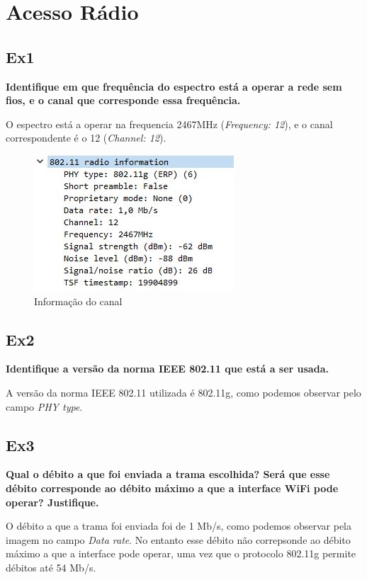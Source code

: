 \documentclass{article}
\begin{document}
\section{Acesso Rádio}
\subsection{Ex1}
\textbf{Identifique em que frequência do espectro está a operar a rede sem fios, e o canal que corresponde essa frequência.}\\\par
O espectro está a operar na frequencia 2467MHz (\textit{Frequency: 12}), e o canal correspondente é o 12 (\textit{Channel: 12}). 
\begin{figure}[h]
	\centering
	\includegraphics[scale = 0.8]{ex-1.JPG}
	\caption{Informação do canal}
\end{figure}

\subsection{Ex2}
\textbf{Identifique a versão da norma IEEE 802.11 que está a ser usada.}\\\par
A versão da norma IEEE 802.11 utilizada é 802.11g, como podemos observar pelo campo \textit{PHY type}.

\subsection{Ex3}
\textbf{Qual o débito a que foi enviada a trama escolhida? Será que esse débito corresponde ao débito máximo a que a interface WiFi pode operar? Justifique.}\\\par
O débito a que a trama foi enviada foi de 1 Mb/s, como podemos observar pela imagem no campo \textit{Data rate}.
No entanto esse débito não correpsonde ao débito máximo a que a interface pode operar, uma vez que o protocolo 802.11g permite débitos até 54 Mb/s.
\end{document}
